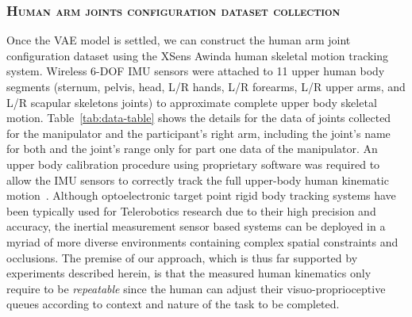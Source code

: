 \subsubsection{\textbf{\textsc{Human arm joints configuration dataset collection}}}\label{awinda_data}
Once the VAE model is settled, we can construct the human arm joint configuration dataset using the XSens Awinda human skeletal motion tracking system. Wireless $6$-DOF IMU sensors were attached to 11 upper human body segments (sternum, pelvis, head, L/R hands, L/R forearms, L/R upper arms, and L/R scapular skeletons joints) to approximate complete upper body skeletal motion. Table~\ref{tab:data-table} shows the details for the data of joints collected for the manipulator and the participant's right arm, including the joint's name for both and the joint's range only for part one data of the manipulator. An upper body calibration procedure using proprietary software was required to allow the IMU sensors to correctly track the full upper-body human kinematic motion~\cite{schepers_xsens_2018}. Although optoelectronic target point rigid body tracking systems have been typically used for Telerobotics research due to their high precision and accuracy, the inertial measurement sensor based systems can be deployed in a myriad of more diverse environments containing complex spatial constraints and occlusions. The premise of our approach, which is thus far supported by experiments described herein, is that the measured human kinematics only require to be \emph{repeatable} since the human can adjust their visuo-proprioceptive queues according to context and nature of the task to be completed. 

